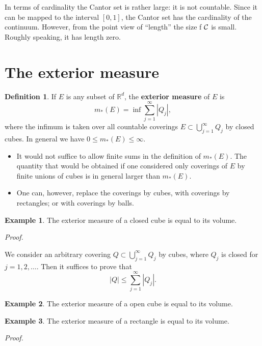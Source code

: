 \documentclass[
]{book}
\providecommand{\tightlist}{%
  \setlength{\itemsep}{0pt}\setlength{\parskip}{0pt}}
\theoremstyle{definition}
\newtheorem{definition}{Definition}[chapter]
\theoremstyle{definition}
\newtheorem{example}{Example}[chapter]
\theoremstyle{definition}
\theoremstyle{definition}
\theoremstyle{remark}
\begin{document}
In terms of cardinality the Cantor set is rather large: it is not countable. Since it can be mapped to the interval \([0,1]\), the Cantor set has the cardinality of the continuum. However, from the point view of ``length'' the size f \(\cal C\) is small. Roughly speaking, it has length zero.

\section{The exterior measure}\label{the-exterior-measure}

\begin{definition}
If \(E\) is any subset of \(\mathbb{R}^d\), the \textbf{exterior measure} of \(E\) is
\[
m_{\ast}(E) = \inf\sum_{j=1}^{\infty}|Q_j|,
\]
where the infimum is taken over all countable coverings \(E\subset \bigcup_{j=1}^{\infty}Q_j\) by closed cubes. In general we have \(0\leq m_{\ast}(E)\leq \infty\).
\end{definition}

\begin{itemize}
\tightlist
\item
  It would not suffice to allow finite sums in the definition of \(m_{\ast}(E)\). The quantity that would be obtained if one considered only coverings of \(E\) by finite unions of cubes is in general larger than \(m_{\ast}(E)\).
\item
  One can, however, replace the coverings by cubes, with coverings by rectangles; or with coverings by balls.
\end{itemize}

\begin{example}
The exterior measure of a closed cube is equal to its volume.
\end{example}

\emph{Proof.}

We consider an arbitrary covering \(Q\subset \bigcup_{j=1}^{\infty}Q_j\) by cubes, where \(Q_j\) is closed for \(j=1,2,\dots\). Then it suffices to prove that
\[
  |Q|\leq \sum_{j=1}^{\infty}|Q_j|.
\]

\begin{example}
The exterior measure of a open cube is equal to its volume.
\end{example}

\begin{example}
The exterior measure of a rectangle is equal to its volume.
\end{example}

\emph{Proof.}
\end{document}
